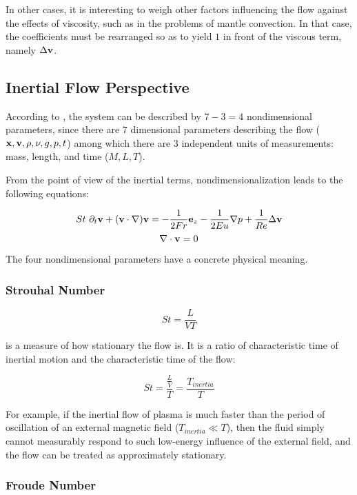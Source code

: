 In other cases, it is interesting to weigh other factors influencing the flow against the effects of viscosity, such as in the problems of mantle convection. In that case, the coefficients must be rearranged so as to yield $1$ in front of the viscous term, namely $\Delta\mathbf{v}$. 

\subsection{Inertial Flow Perspective}

According to  \cite{barenblatt1}, the system can be described by $7 - 3 = 4$ nondimensional parameters, since there are $7$ dimensional parameters describing the flow ($\mathbf{x}, \mathbf{v}, \rho, \nu, g, p, t$) among which there are $3$ independent units of measurements: mass, length, and time ($M, L, T$).

From the point of view of the inertial terms, nondimensionalization leads to the following equations:

\begin{equation} \label{NS1-inertNondim}
St~ \partial_t\mathbf{v} + (\mathbf{v} \cdot \nabla)\mathbf{v} = -\frac{1}{2Fr} \mathbf{e}_z - \frac{1}{2 Eu}\nabla p + \frac{1}{Re}\Delta\mathbf{v} 
\end{equation}
\begin{equation} \label{NS2-inertNondim}
\nabla\cdot\mathbf{v} = 0 
\end{equation}

The four nondimensional parameters have a concrete physical meaning.

\subsubsection{Strouhal Number}

$$St = \frac{L}{VT}$$

is a measure of how stationary the flow is. It is a ratio of characteristic time of inertial motion and the characteristic time of the flow:

$$ St = \frac{\frac{L}{V}}{T} = \frac{T_{inertia}}{T}$$

For example, if the inertial flow of plasma is much faster than the period of oscillation of an external magnetic field ($ T_{inertia} \ll T$), then the fluid simply cannot measurably respond to such low-energy influence of the external field, and the flow can be treated as approximately stationary.

\subsubsection{Froude Number}

